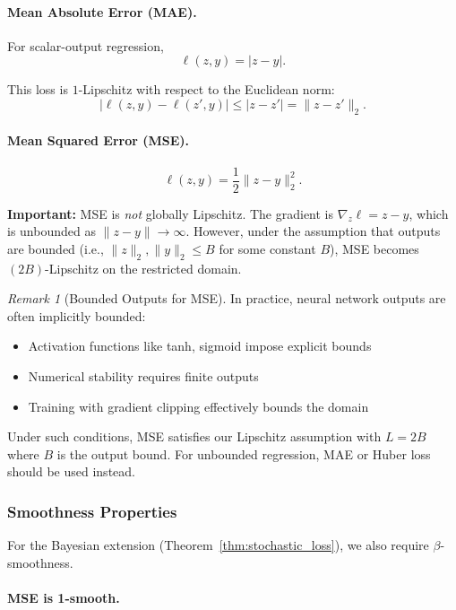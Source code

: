 \documentclass{article}
\theoremstyle{plain}
\theoremstyle{definition}
\theoremstyle{remark}
\newtheorem{remark}[theorem]{Remark}
\begin{document}
\paragraph{Mean Absolute Error (MAE).}

For scalar-output regression,
\[
\ell(z, y) = |z - y|.
\]

This loss is $1$-Lipschitz with respect to the Euclidean norm:
\[
|\ell(z, y) - \ell(z', y)| \leq |z - z'| = \|z - z'\|_2.
\]


\paragraph{Mean Squared Error (MSE).}

\[
\ell(z, y) = \frac{1}{2}\|z - y\|_2^2.
\]

\textbf{Important:} MSE is \emph{not} globally Lipschitz. The gradient is $\nabla_z \ell = z - y$, which is unbounded as $\|z - y\| \to \infty$. However, under the assumption that outputs are bounded (i.e., $\|z\|_2, \|y\|_2 \leq B$ for some constant $B$), MSE becomes $(2B)$-Lipschitz on the restricted domain.

\begin{remark}[Bounded Outputs for MSE]
In practice, neural network outputs are often implicitly bounded:
\begin{itemize}
    \item Activation functions like tanh, sigmoid impose explicit bounds
    \item Numerical stability requires finite outputs
    \item Training with gradient clipping effectively bounds the domain
\end{itemize}
Under such conditions, MSE satisfies our Lipschitz assumption with $L = 2B$ where $B$ is the output bound. For unbounded regression, MAE or Huber loss should be used instead.
\end{remark}

\subsubsection{Smoothness Properties}

For the Bayesian extension (Theorem~\ref{thm:stochastic_loss}), we also require $\beta$-smoothness.

\paragraph{MSE is 1-smooth.}
\end{document}
